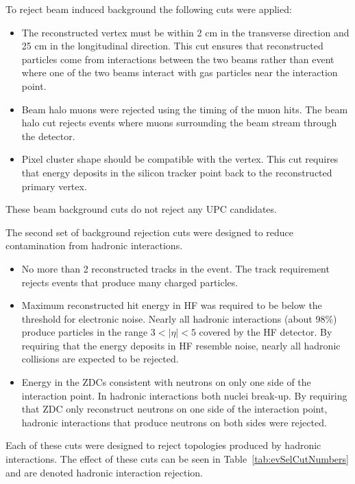       To reject beam induced background the following cuts were applied:
      \begin{itemize}
        \item The reconstructed vertex must be within 2 cm in 
          the transverse direction and 25 cm in the 
          longitudinal direction. This cut ensures that reconstructed particles 
          come from interactions between the two beams rather than event where 
          one of the two beams interact with gas particles near the interaction 
          point. 
  	    \item Beam halo muons were rejected using the timing of the muon hits.
          The beam halo cut rejects events where muons surrounding the beam 
          stream through the detector. 
  	    \item Pixel cluster shape should be compatible with the vertex. 
          This cut requires that energy deposits in the silicon tracker point 
            back to the reconstructed  primary vertex. 
      \end{itemize}
      These beam background cuts do not reject any UPC \JPsi{} candidates. 

      The second set of background rejection cuts were designed to 
        reduce contamination from hadronic interactions. 
      \begin{itemize}
  	    \item No more than 2 reconstructed tracks in the event.
          The track requirement rejects events that produce many charged 
          particles.
  	    \item Maximum reconstructed hit energy in HF was required to be below 
            the threshold for electronic noise. 
          Nearly all hadronic interactions (about 98\%) produce particles in 
            the range $3<|\eta|<5$ covered by the HF detector.
          By requiring that the energy deposits in HF resemble noise, nearly all
            \DIFdelbegin {}\DIFdelend \DIFaddbegin {}\DIFaddend hadronic collisions are expected to be rejected.
  	    \item Energy in the ZDCs consistent with neutrons on only one side 
            of the interaction point.
          In hadronic interactions both nuclei break-up. 
          By requiring that ZDC only reconstruct neutrons on one side of the 
            interaction point, hadronic interactions that produce neutrons on 
            both sides were rejected.
      \end{itemize}
      Each of these cuts were designed to reject topologies produced by 
        hadronic interactions.
      The effect of these cuts can be seen in Table~\ref{tab:evSelCutNumbers} 
        and are denoted hadronic interaction rejection. 

